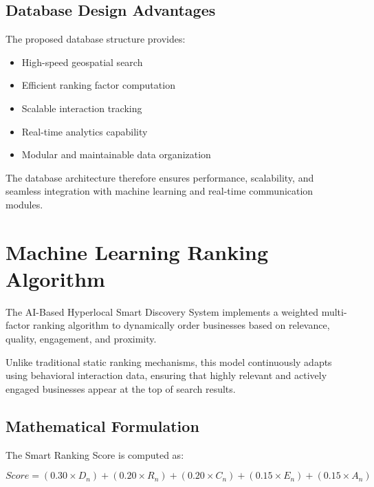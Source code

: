 \documentclass[12pt,a4paper]{report}
\begin{document}
\section{Database Design Advantages}

The proposed database structure provides:

\begin{itemize}

\item High-speed geospatial search

\item Efficient ranking factor computation

\item Scalable interaction tracking

\item Real-time analytics capability

\item Modular and maintainable data organization

\end{itemize}

The database architecture therefore ensures performance, scalability, and seamless integration with machine learning and real-time communication modules.


\chapter{Machine Learning Ranking Algorithm}

The AI-Based Hyperlocal Smart Discovery System implements a weighted multi-factor ranking algorithm to dynamically order businesses based on relevance, quality, engagement, and proximity.

Unlike traditional static ranking mechanisms, this model continuously adapts using behavioral interaction data, ensuring that highly relevant and actively engaged businesses appear at the top of search results.

\section{Mathematical Formulation}

The Smart Ranking Score is computed as:

\[

Score = (0.30 \times D_n) + (0.20 \times R_n) + (0.20 \times C_n) + (0.15 \times E_n) + (0.15 \times A_n)

\]
\end{document}

